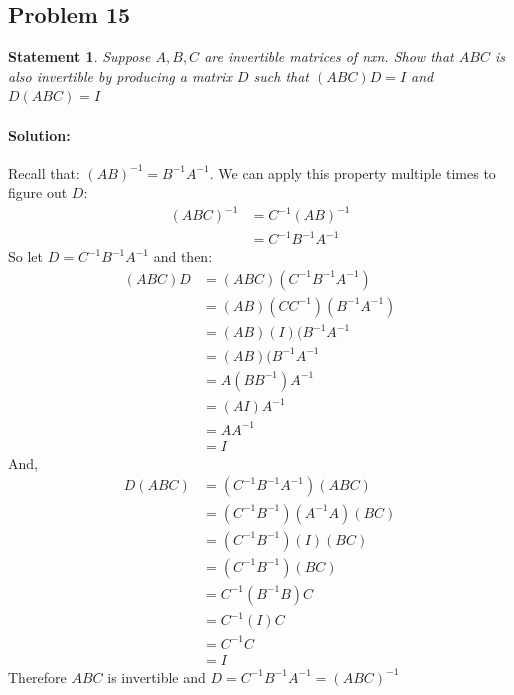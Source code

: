 \documentclass[12pt, letterpaper]{article}
\theoremstyle{statement}
\theoremstyle{statement}
\newtheorem*{atmStat}{Statement}
\newenvironment{Solution}{\noindent\ignorespaces\paragraph{Solution:}}{\hfill \ding{122}\par\noindent}
\begin{document}
    \subsection*{Problem 15}
    \begin{atmStat}
    Suppose $A, B, C$ are invertible matrices of nxn. Show that $ABC$ is also invertible by producing a matrix $D$ such that $(ABC)D=I$ and $D(ABC)=I$ 
    \end{atmStat}
    \begin{Solution}
    Recall that: $(AB)^{-1}=B^{-1}A^{-1}$. We can apply this property multiple times to figure out $D$: 
    \begin{align*}
    (ABC)^{-1} &= C^{-1}(AB)^{-1}\\
    &= C^{-1}B^{-1}A^{-1}
    \end{align*}
    So let $D=C^{-1}B^{-1}A^{-1}$ and then:
    \begin{align*}
        (ABC)D &= (ABC)(C^{-1}B^{-1}A^{-1}) \\
        &= (AB)(CC^{-1})(B^{-1}A^{-1}) \\
        &= (AB)(I)(B^{-1}A^{-1} \\
        &= (AB)(B^{-1}A^{-1} \\
        &= A(BB^{-1})A^{-1} \\
        &= (AI)A^{-1} \\
        &= AA^{-1} \\
        &= I
    \end{align*}
    And, 
    \begin{align*}
        D(ABC) &= (C^{-1}B^{-1}A^{-1})(ABC) \\
        &= (C^{-1}B^{-1})(A^{-1}A)(BC) \\
        &= (C^{-1}B^{-1})(I)(BC) \\
        &= (C^{-1}B^{-1})(BC) \\
        &= C^{-1}(B^{-1}B)C \\
        &= C^{-1}(I)C \\
        &= C^{-1}C \\
        &= I
    \end{align*}
    Therefore $ABC$ is invertible and $D= C^{-1}B^{-1}A^{-1} = (ABC)^{-1}$
    
    \end{Solution}
\end{document}
